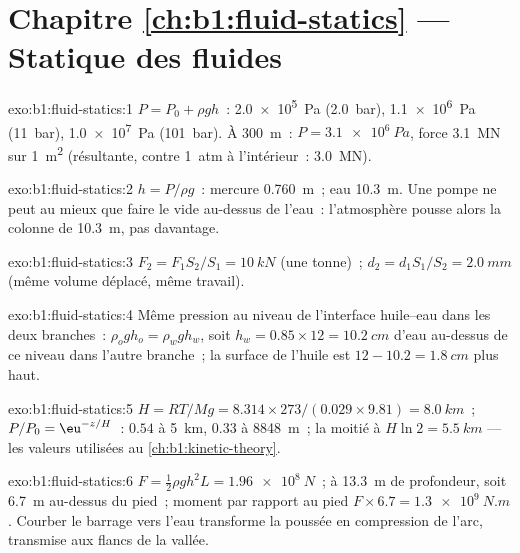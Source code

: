 \section*{Chapitre \ref{ch:b1:fluid-statics} --- Statique des fluides}

\begin{solution}{exo:b1:fluid-statics:1}
$P = P_0 + \rho gh$~: \qty{2.0e5}{Pa} (\qty{2.0}{bar}), \qty{1.1e6}{Pa}
(\qty{11}{bar}), \qty{1.0e7}{Pa} (\qty{101}{bar}). À \qty{300}{m}~: $P =
\qty{3.1e6}{Pa}$, force \qty{3.1}{MN} sur \qty{1}{m^2} (résultante, contre
\qty{1}{atm} à l'intérieur~: \qty{3.0}{MN}).
\end{solution}

\begin{solution}{exo:b1:fluid-statics:2}
$h = P/\rho g$~: mercure \qty{0.760}{m}~; eau \qty{10.3}{m}. Une pompe ne peut
au mieux que faire le vide au-dessus de l'eau~: l'atmosphère pousse alors la
colonne de \qty{10.3}{m}, pas davantage.
\end{solution}

\begin{solution}{exo:b1:fluid-statics:3}
$F_2 = F_1S_2/S_1 = \qty{10}{kN}$ (une tonne)~; $d_2 = d_1S_1/S_2 = \qty{2.0}{mm}$
(même volume déplacé, même travail).
\end{solution}

\begin{solution}{exo:b1:fluid-statics:4}
Même pression au niveau de l'interface huile--eau dans les deux branches~: $\rho_og
h_o = \rho_wgh_w$, soit $h_w = 0.85 \times 12 = \qty{10.2}{cm}$ d'eau au-dessus
de ce niveau dans l'autre branche~; la surface de l'huile est $12 - 10.2 = \qty{1.8}{cm}$
plus haut.
\end{solution}

\begin{solution}{exo:b1:fluid-statics:5}
$H = RT/Mg = 8.314 \times 273/(0.029 \times 9.81) = \qty{8.0}{km}$~; $P/P_0 =
\eu^{-z/H}$~: $0.54$ à \qty{5}{km}, $0.33$ à \qty{8848}{m}~; la moitié à $H\ln2 =
\qty{5.5}{km}$ --- les valeurs utilisées au \cref{ch:b1:kinetic-theory}.
\end{solution}

\begin{solution}{exo:b1:fluid-statics:6}
$F = \tfrac12\rho gh^2L = \qty{1.96e8}{N}$~;  à \qty{13.3}{m}
de profondeur, soit \qty{6.7}{m} au-dessus du pied~; moment par rapport au pied $F \times
6.7 = \qty{1.3e9}{N.m}$. Courber le barrage vers l'eau transforme la poussée
en compression de l'arc, transmise aux flancs de la vallée.
\end{solution}

